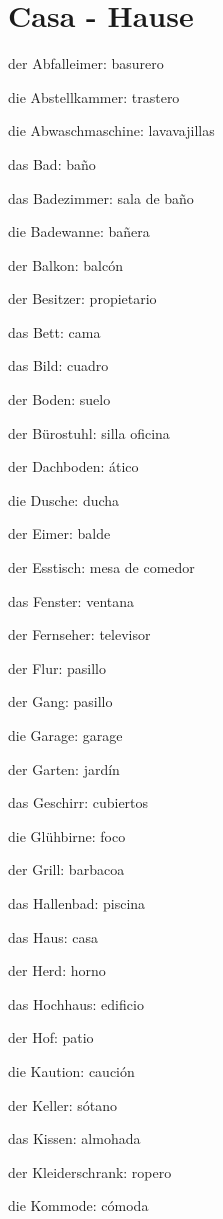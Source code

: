 \section{Casa - Hause}
\begin{multicols}{2}
\begin{myitemize}
\item der Abfalleimer: basurero
\item die Abstellkammer: trastero
\item die Abwaschmaschine: lavavajillas
\item das Bad: baño
\item das Badezimmer: sala de baño
\item die Badewanne: bañera
\item der Balkon: balcón
\item der Besitzer: propietario
\item das Bett: cama
\item das Bild: cuadro
\item der Boden: suelo
\item der Bürostuhl: silla oficina
\item der Dachboden: ático
\item die Dusche: ducha
\item der Eimer: balde
\item der Esstisch: mesa de comedor
\item das Fenster: ventana
\item der Fernseher: televisor
\item der Flur: pasillo
\item der Gang: pasillo
\item die Garage: garage
\item der Garten: jardín
\item das Geschirr: cubiertos
\item die Glühbirne: foco
\item der Grill: barbacoa
\item das Hallenbad: piscina
\item das Haus: casa
\item der Herd: horno
\item das Hochhaus: edificio
\item der Hof: patio
\item die Kaution: caución
\item der Keller: sótano
\item das Kissen: almohada
\item der Kleiderschrank: ropero
\item die Kommode: cómoda

\end{myitemize}
\end{multicols}

